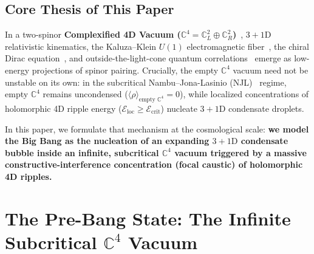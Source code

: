 \documentclass[11pt,a4paper]{article}
\begin{document}
\subsection*{Core Thesis of This Paper}
In a two-spinor \textbf{Complexified 4D Vacuum ($\mathbb{C}^4 = \mathbb{C}^2_L \oplus \mathbb{C}^2_R$)}~\cite{Penrose1967,PenroseRindler1984}, $3+1\text{D}$ relativistic kinematics, the Kaluza--Klein $U(1)$ electromagnetic fiber~\cite{Kaluza1921,Klein1926,Wesson1999}, the chiral Dirac equation~\cite{Dirac1928,PenroseRoad2004}, and outside-the-light-cone quantum correlations~\cite{Feynman1949,Bell1964} emerge as low-energy projections of spinor pairing. Crucially, the empty $\mathbb{C}^4$ vacuum need not be unstable on its own: in the subcritical Nambu--Jona-Lasinio (NJL)~\cite{NJL1961} regime, empty $\mathbb{C}^4$ remains uncondensed ($\langle\rho\rangle_{\text{empty }\mathbb{C}^4} = 0$), while localized concentrations of holomorphic 4D ripple energy ($\mathcal{E}_{\text{loc}} \ge \mathcal{E}_{\text{crit}}$) nucleate $3+1\text{D}$ condensate droplets.

In this paper, we formulate that mechanism at the cosmological scale: \textbf{we model the Big Bang as the nucleation of an expanding $3+1\text{D}$ condensate bubble inside an infinite, subcritical $\mathbb{C}^4$ vacuum triggered by a massive constructive-interference concentration (focal caustic) of holomorphic 4D ripples.}

\section{The Pre-Bang State: The Infinite Subcritical \texorpdfstring{$\mathbb{C}^4$}{C4} Vacuum}
\end{document}
